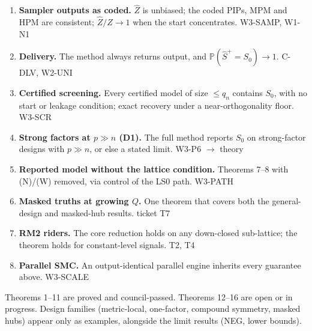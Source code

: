 \documentclass[11pt,a4paper]{article}
\newcommand{\Szero}{S_0}
\newcommand{\Shat}{\hat S^{+}}
\newcommand{\Prob}{\mathbb{P}}
\theoremstyle{definition}
\begin{document}
\begin{enumerate}[leftmargin=2em,itemsep=4pt,label=\textbf{\arabic*.}]
\item \textbf{Sampler outputs as coded.} $\hat Z$ is unbiased; the coded PIPs, MPM and HPM are consistent; $\hat Z/Z\to1$ when the start concentrates. \hfill{\footnotesize W3-SAMP, W1-N1}
\item \textbf{Delivery.} The method always returns output, and $\Prob(\Shat=\Szero)\to1$. \hfill{\footnotesize C-DLV, W2-UNI}
\item \textbf{Certified screening.} Every certified model of size $\le q_n$ contains $\Szero$, with no start or leakage condition; exact recovery under a near-orthogonality floor. \hfill{\footnotesize W3-SCR}
\item \textbf{Strong factors at $p\gg n$ (D1).} The full method reports $\Szero$ on strong-factor designs with $p\gg n$, or else a stated limit. \hfill{\footnotesize W3-P6 $\to$ theory}
\item \textbf{Reported model without the lattice condition.} Theorems 7--8 with (N)/(W) removed, via control of the LS0 path. \hfill{\footnotesize W3-PATH}
\item \textbf{Masked truths at growing $Q$.} One theorem that covers both the general-design and masked-hub results. \hfill{\footnotesize ticket T7}
\item \textbf{RM2 riders.} The core reduction holds on any down-closed sub-lattice; the theorem holds for constant-level signals. \hfill{\footnotesize T2, T4}
\item \textbf{Parallel SMC.} An output-identical parallel engine inherits every guarantee above. \hfill{\footnotesize W3-SCALE}
\end{enumerate}

\vspace{2pt}
{\small Theorems 1--11 are proved and council-passed. Theorems 12--16 are open or in progress. Design families
(metric-local, one-factor, compound symmetry, masked hubs) appear only as examples, alongside the limit results (NEG,
lower bounds).}

\newpage
\end{document}
